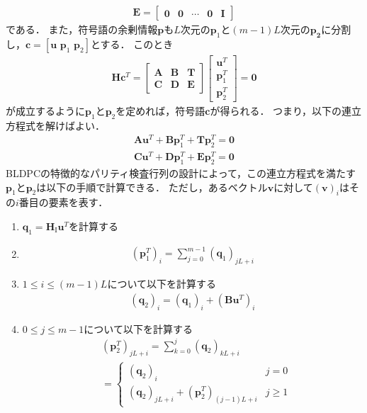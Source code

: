 \documentclass[twocolumn, a4paper]{ieicejsp}
\begin{document}
\begin{align}
  \mathbf{E} = \begin{bmatrix}
    \mathbf{0} & \mathbf{0} & \cdots & \mathbf{0} & \mathbf{I}
  \end{bmatrix}
\end{align}
である．
また，符号語の余剰情報$\mathbf{p}$も$L$次元の$\mathbf{p}_1$と$(m-1)L$次元の$\mathbf{p_2}$に分割し，$\mathbf{c}=[\mathbf{u} \,\, \mathbf{p}_1 \,\, \mathbf{p}_2]$とする．
このとき
\begin{align}
  \mathbf{H}\mathbf{c}^T = \begin{bmatrix}
    \mathbf{A} & \mathbf{B} & \mathbf{T} \\
    \mathbf{C} & \mathbf{D} & \mathbf{E}
  \end{bmatrix}
  \begin{bmatrix}
    \mathbf{u}^T \\
    \mathbf{p}_1^T \\
    \mathbf{p}_2^T
  \end{bmatrix} = \mathbf{0}
\end{align}
が成立するように$\mathbf{p}_1$と$\mathbf{p}_2$を定めれば，符号語$\mathbf{c}$が得られる．
つまり，以下の連立方程式を解けばよい．
\begin{align}
  \mathbf{A}\mathbf{u}^T + \mathbf{B} \mathbf{p}_1^T + \mathbf{T} \mathbf{p}_2^T = \mathbf{0} \\
  \mathbf{C}\mathbf{u}^T + \mathbf{D} \mathbf{p}_1^T + \mathbf{E} \mathbf{p}_2^T = \mathbf{0}
\end{align}
BLDPCの特徴的なパリティ検査行列の設計によって，この連立方程式を満たす$\mathbf{p}_1$と$\mathbf{p}_2$は以下の手順で計算できる．
ただし，あるベクトル$\mathbf{v}$に対して$(\mathbf{v})_i$はその$i$番目の要素を表す．
\begin{enumerate}
  \item $\mathbf{q}_1 = \mathbf{H}_\mathrm{I} \mathbf{u}^T$を計算する
  \item  
  \begin{align*}
    (\mathbf{p}_1^T)_i = \sum_{j=0}^{m-1} (\mathbf{q}_1)_{jL+i}
  \end{align*}
  \item  $1 \leq i \leq (m-1)L$について以下を計算する
  \begin{align*}
    (\mathbf{q}_2)_i = (\mathbf{q}_\mathrm{1})_i + (\mathbf{B} \mathbf{u}^T)_i
  \end{align*}
  
  \item $0 \leq j \leq m-1$について以下を計算する
    \begin{align*}
      &(\mathbf{p}_2^T)_{jL+i} = \sum_{k=0}^j (\mathbf{q}_2)_{kL+i} \\
      &= \begin{cases}
        (\mathbf{q}_2)_{i} & j=0 \\
        (\mathbf{q}_2)_{jL+i} + (\mathbf{p}_2^T)_{(j-1)L+i} & j \geq 1
      \end{cases} 
    \end{align*}  
\end{enumerate}
\end{document}
